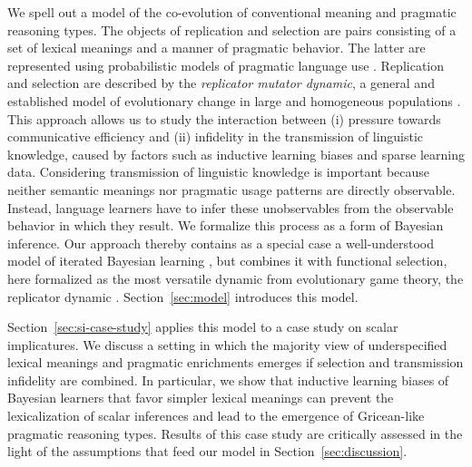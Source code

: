 \documentclass[a4paper, 11pt]{article}
\theoremstyle{Satz}
\begin{document}
We spell out a model of the co-evolution of conventional meaning and pragmatic reasoning
types. The objects of replication and selection are pairs consisting of a set of lexical
meanings and a manner of pragmatic behavior. The latter are represented using probabilistic
models of pragmatic language use
\citep{frank+goodman:2012,FrankeJager2015:Probabilistic-p,GoodmanFrank2016:Pragmatic-Langu}. Replication
and selection are described by the \emph{replicator mutator dynamic}, a general and established
model of evolutionary change in large and homogeneous populations
\citep{Hofbauer1985:The-Selection-M,nowak+etal:2000,NowakKomarova2001:Evolution-of-Un,hofbauer+sigmund:2003,Nowak2006:Evolutionary-Dy}. This
approach allows us to study the interaction between (i) pressure towards communicative
efficiency and (ii) infidelity in the transmission of linguistic knowledge, caused by factors
such as inductive learning biases and sparse learning data. Considering transmission of
linguistic knowledge is important because neither semantic meanings nor pragmatic usage
patterns are directly observable. Instead, language learners have to infer these unobservables
from the observable behavior in which they result. We formalize this process as a form of
Bayesian inference. Our approach thereby contains as a special case a well-understood model of
iterated Bayesian learning \citep{griffiths+kalish:2007}, but combines it with functional
selection, here formalized as the most versatile dynamic from evolutionary game theory, the
replicator dynamic \citep{TaylorJonker1978:Evolutionary-St}. Section~\ref{sec:model} introduces
this model.

Section~\ref{sec:si-case-study} applies this model to a case study on scalar implicatures. We
discuss a setting in which the majority view of underspecified lexical meanings and pragmatic
enrichments emerges if selection and transmission infidelity are combined. In particular, we
show that inductive learning biases of Bayesian learners that favor simpler lexical meanings
can prevent the lexicalization of scalar inferences and lead to the emergence of Gricean-like
pragmatic reasoning types. Results of this case study are critically assessed in the light of
the assumptions that feed our model in Section~\ref{sec:discussion}.

\end{document}
